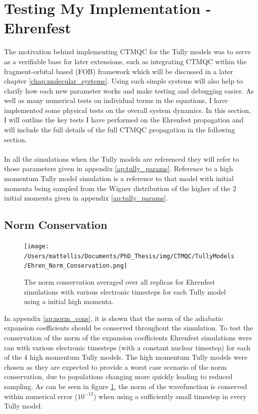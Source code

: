 \section{Testing My Implementation -Ehrenfest}
The motivation behind implementing CTMQC for the Tully models was to serve as a verifiable base for later extensions, such as integrating CTMQC within the fragment-orbital based (FOB) \cite{spencer_fob-sh:_2016} framework which will be discussed in a later chapter \ref{chap:molecular_systems}. Using such simple systems will also help to clarify how each new parameter works and make testing and debugging easier. As well as many numerical tests on individual terms in the equations,  I have implemented some physical tests on the overall system dynamics. In this section, I will outline the key tests I have performed on the Ehrenfest propagation and will include the full details of the full CTMQC propagation in the following section.
\\\\
In all the simulations when the Tully models are referenced they will refer to those parameters given in appendix \ref{ap:tully_params}. Reference to a high momentum Tully model simulation is a reference to that model with initial momenta being sampled from the Wigner distribution of the higher of the 2 initial momenta given in appendix \ref{ap:tully_params}.

\subsection{Norm Conservation}
\label{sect:normConsEhren}
\begin{figure}[ht]
	\texttt{[image: /Users/mattellis/Documents/PhD\_Thesis/img/CTMQC/TullyModels/Ehren\_Norm\_Conservation.png]}
	\caption{\label{fig:EhrenNormCons}The norm conservation averaged over all replicas for Ehrenfest simulations with various electronic timesteps for each Tully model using a initial high momenta.}
\end{figure}
\noindent In appendix \ref{ap:norm_cons}, it is shown that the norm of the adiabatic expansion coefficients should be conserved throughout the simulation. To test the conservation of the norm of the expansion coefficients Ehrenfest simulations were ran with various electronic timesteps (with a constant nuclear timestep) for each of the 4 high momentum Tully models. The high momentum Tully models were chosen as they are expected to provide a worst case scenario of the norm conservation, due to populations changing more quickly leading to reduced sampling. As can be seen in figure \ref{fig:EhrenNormCons}, the norm of the wavefunction is conserved within numerical error ($10^{-12}$) when     using a sufficiently small timestep in every Tully model.

